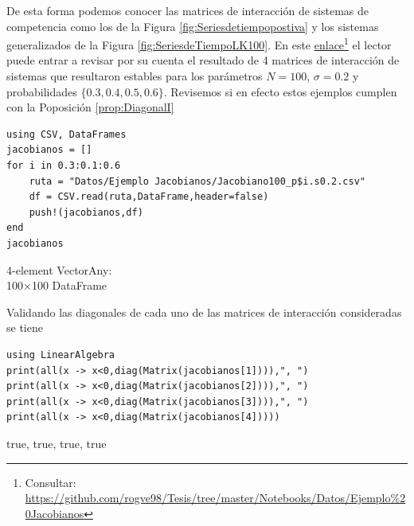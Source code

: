 De esta forma podemos conocer las matrices de interacción de sistemas de competencia como los de la Figura \ref{fig:Seriesdetiempopostiva} y los sistemas generalizados de la Figura \ref{fig:SeriesdeTiempoLK100}. En este \href{https://github.com/rogve98/Tesis/tree/master/Notebooks/Datos/Ejemplo%20Jacobianos}{enlace}\footnote{Consultar: \url{https://github.com/rogve98/Tesis/tree/master/Notebooks/Datos/Ejemplo\%20Jacobianos}} el lector puede entrar a revisar por su cuenta el resultado de 4 matrices de interacción de sistemas que resultaron estables para los parámetros $N=100$, $\sigma=0.2$ y probabilidades $\{0.3,0.4,0.5,0.6\}$. Revisemos si en efecto estos ejemplos cumplen con la Poposición \ref{prop:DiagonalI}
\begin{tcolorbox}[colback=green!10!white, colframe=black, title=Entrada]
	\begin{verbatim}
using CSV, DataFrames
jacobianos = []
for i in 0.3:0.1:0.6
    ruta = "Datos/Ejemplo Jacobianos/Jacobiano100_p$i.s0.2.csv"
    df = CSV.read(ruta,DataFrame,header=false)
    push!(jacobianos,df)
end
jacobianos
	\end{verbatim}
\end{tcolorbox}

\begin{tcolorbox}[colback=red!10!white, colframe=black, title=Salida]
4-element Vector{Any}:\\
100×100 DataFrame
\end{tcolorbox}

Validando las diagonales de cada uno de las matrices de interacción consideradas se tiene

\begin{tcolorbox}[colback=green!10!white, colframe=black, title=Entrada]
	\begin{verbatim}
using LinearAlgebra
print(all(x -> x<0,diag(Matrix(jacobianos[1]))),", ")
print(all(x -> x<0,diag(Matrix(jacobianos[2]))),", ")
print(all(x -> x<0,diag(Matrix(jacobianos[3]))),", ")
print(all(x -> x<0,diag(Matrix(jacobianos[4]))))
	\end{verbatim}
\end{tcolorbox}

\begin{tcolorbox}[colback=red!10!white, colframe=black, title=Salida]
true, true, true, true
\end{tcolorbox}

